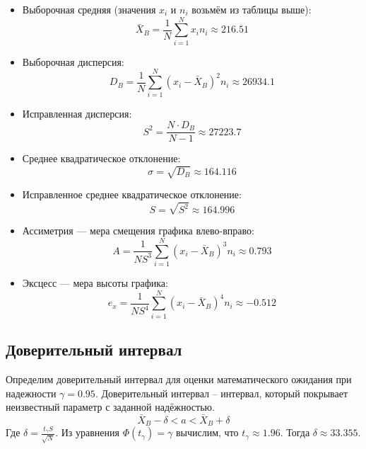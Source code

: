 \documentclass[titlepage]{article}
\begin{document}
\begin{itemize}

\item
Выборочная средняя (значения $x_i$ и $n_i$ возьмём из таблицы выше):
\begin{equation*}
\bar{X}_B = \frac{1}{N} \sum_{i = 1}^N x_i n_i \approx 216.51
\end{equation*}

\item
Выборочная дисперсия:
\begin{equation*}
D_B = \frac{1}{N} \sum_{i = 1}^N (x_i - \bar{X}_B)^2 n_i \approx 26934.1
\end{equation*}

\item
Исправленная дисперсия:
\begin{equation*}
S^2 = \frac{N \cdot D_B}{N - 1} \approx 27223.7
\end{equation*}

\item
Среднее квадратическое отклонение:
\begin{equation*}
\sigma = \sqrt{D_B} \approx 164.116
\end{equation*}

\item
Исправленное среднее квадратическое отклонение:
\begin{equation*}
S = \sqrt{S^2} \approx 164.996
\end{equation*}

\item
Ассиметрия --- мера смещения графика влево-вправо:
\begin{equation*}
A = \frac{1}{N S^3} \sum_{i = 1}^N (x_i - \bar{X}_B)^3 n_i \approx 0.793
\end{equation*}

\item
Эксцесс --- мера высоты графика:
\begin{equation*}
e_x = \frac{1}{N S^4} \sum_{i = 1}^N (x_i - \bar{X}_B)^4 n_i \approx -0.512
\end{equation*}
\end{itemize}

\subsection{Доверительный интервал}
Определим доверительный интервал для оценки математического ожидания при надежности $\gamma = 0.95$.
Доверительный интервал – интервал, который покрывает неизвестный параметр с заданной надёжностью.
\begin{equation*}
\bar{X}_B - \delta < a < \bar{X}_B + \delta
\end{equation*}
Где $\delta = \frac{t_{\gamma} S}{\sqrt N}$. Из уравнения $\Phi (t_{\gamma}) = \gamma$ вычислим, что $t_{\gamma} \approx 1.96$. Тогда $\delta \approx 33.355$.
\end{document}
